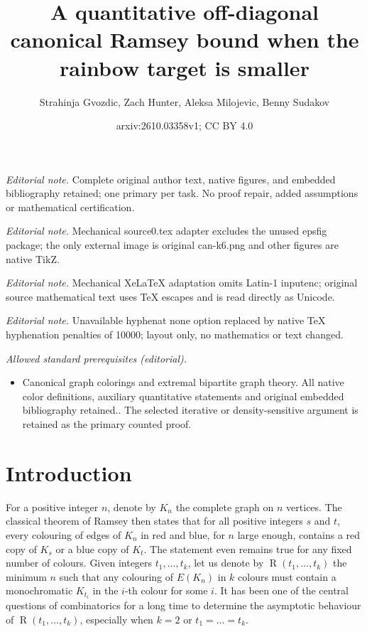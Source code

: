 \documentclass[10pt,a4paper]{article}
\title{A quantitative off-diagonal canonical Ramsey bound when the rainbow target is smaller}
\author{Strahinja Gvozdic, Zach Hunter, Aleksa Milojevic, Benny Sudakov}
\date{arxiv:2610.03358v1; CC BY 4.0}
\theoremstyle{plain}
\theoremstyle{definition}
\begin{document}
\maketitle
\noindent\textit{Editorial note.} Complete original author text, native figures, and embedded bibliography retained; one primary per task. No proof repair, added assumptions or mathematical certification.\par\medskip
\noindent\textit{Editorial note.} Mechanical source0.tex adapter excludes the unused epsfig package; the only external image is original can-k6.png and other figures are native TikZ.\par\medskip
\noindent\textit{Editorial note.} Mechanical XeLaTeX adaptation omits Latin-1 inputenc; original source mathematical text uses TeX escapes and is read directly as Unicode.\par\medskip
\noindent\textit{Editorial note.} Unavailable hyphenat none option replaced by native TeX hyphenation penalties of 10000; layout only, no mathematics or text changed.\par\medskip
\noindent\textit{Allowed standard prerequisites (editorial).}\begin{itemize}
\item Canonical graph colorings and extremal bipartite graph theory. All native color definitions, auxiliary quantitative statements and original embedded bibliography retained.. The selected iterative or density-sensitive argument is retained as the primary counted proof.
\end{itemize}\medskip
\section{Introduction}\label{sec-intro}

For a positive integer $n$, denote by $K_n$ the complete graph on $n$ vertices. The classical theorem of Ramsey then states that for all positive integers $s$ and $t$, every colouring of edges of $K_n$ in red and blue, for $n$ large enough, contains a red copy of $K_s$ or a blue copy of $K_t$. The statement even remains true for any fixed number of colours. Given integers $t_1,\dots,t_k$, let us denote by $\operatorname{R}(t_1,\dots,t_k)$ the minimum $n$ such that any colouring of $E(K_n)$ in $k$ colours must contain a monochromatic $K_{t_i}$ in the $i$-th colour for some $i$. It has been one of the central questions of combinatorics for a long time to determine the asymptotic behaviour of $\operatorname{R}(t_1,\dots,t_k)$, especially when $k=2$ or $t_1=\dots=t_k$.
\end{document}
